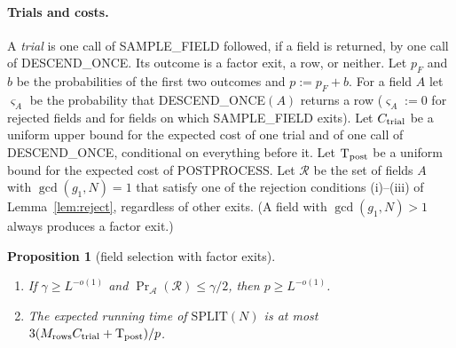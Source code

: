 \documentclass[11pt]{amsart}
\newtheorem{proposition}[theorem]{Proposition}
\theoremstyle{definition}
\newcommand{\cA}{\mathcal{A}}
\newcommand{\cR}{\mathcal{R}}
\newcommand{\Prob}{\Pr}
\begin{document}
\paragraph{Trials and costs.} A \emph{trial} is one call of SAMPLE\_FIELD followed, if a field is returned, by one call
of DESCEND\_ONCE. Its outcome is a factor exit, a row, or neither. Let $p_F$ and $b$ be the probabilities of the first two
outcomes and $p:=p_F+b$. For a field $A$ let $\varsigma_A$ be the probability that DESCEND\_ONCE$(A)$ returns a row ($\varsigma_A:=0$
for rejected fields and for fields on which SAMPLE\_FIELD exits). Let $C_{\rm trial}$ be a uniform upper bound for the
expected cost of one trial and of one call of DESCEND\_ONCE, conditional on everything before it.
Let $\mathrm T_{\rm post}$ be a uniform bound for the expected cost of POSTPROCESS. Let $\cR$ be the set of fields $A$ with $\gcd(g_1,N)=1$
that satisfy one of the rejection conditions (i)--(iii) of Lemma~\ref{lem:reject}, regardless of other exits. (A field with
$\gcd(g_1,N)>1$ always produces a factor exit.)

\begin{proposition}[field selection with factor exits]\label{prop:select}
\begin{enumerate}[label=(\roman*)]
\item If $\gamma\ge L^{-o(1)}$ and $\Prob_\cA(\cR)\le\gamma/2$, then $p\ge L^{-o(1)}$.
\item The expected running time of $\mathrm{SPLIT}(N)$ is at most $3(M_{\rm rows}C_{\rm trial}+\mathrm T_{\rm post})/p$.
\end{enumerate}
\end{proposition}
\end{document}
